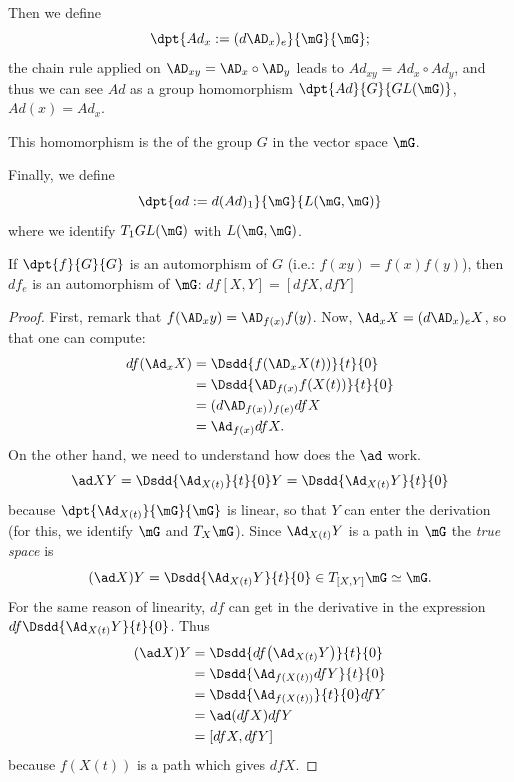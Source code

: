 Then we define
\[
	\dpt{Ad_x:=(d\AD_x)_e}{\mG}{\mG};
\]
the chain rule applied on $\AD_{xy}=\AD_x\circ\AD_y$ leads to $Ad_{xy}=Ad_x\circ Ad_y$, and thus we can see $Ad$ as a group homomorphism $\dpt{Ad}{G}{GL(\mG)}$, $Ad(x)=Ad_x$.

\begin{definition}
	This homomorphism is the  of the group $G$ in the vector space $\mG$.
\end{definition}


Finally, we define
\[
	\dpt{ad:=d(Ad)_1}{\mG}{L(\mG,\mG)}
\]
where we identify $T_1GL(\mG)$ with $L(\mG,\mG)$.

\begin{lemma}\label{LEMooEALFooJOeOgk}
	If $\dpt{f}{G}{G}$ is an automorphism of $G$ (i.e.: $f(xy)=f(x)f(y)$), then $df_e$ is an automorphism of $\mG$: $df[X,Y]=[df X,dfY]$
\end{lemma}

\begin{proof}
	First, remark that $f(\AD_xy)=\AD_{f(x)}f(y)$. Now, $\Ad_x X=(d\AD_x)_eX$, so that one can compute:
	\begin{equation}
		\begin{split}
			df(\Ad_xX) & =\Dsdd{f(\AD_xX(t))}{t}{0}           \\
			           & =\Dsdd{   \AD_{f(x)}f(X(t))  }{t}{0} \\
			           & =(d\AD_{f(x)})_{f(e)}df X            \\
			           & =\Ad_{f(x)}df X.
		\end{split}
	\end{equation}
	On the other hand, we need to understand how does the $\ad$ work.
	\[
		\ad XY=\Dsdd{\Ad_{X(t)}}{t}{0}Y=\Dsdd{\Ad_{X(t)}Y}{t}{0}
	\]
	because $\dpt{\Ad_{X(t)}}{\mG}{\mG}$ is linear, so that $Y$ can enter the derivation (for this, we identify $\mG$ and $T_X\mG$). Since $\Ad_{X(t)}Y$ is a path in $\mG$ the \emph{true space} is
	\[
		(\ad X)Y=\Dsdd{ \Ad_{X(t)}Y }{t}{0}\in T_{[X,Y]}\mG\simeq\mG.
	\]
	For the same reason of linearity, $df$ can get in the derivative in the expression $df\Dsdd{  \Ad_{X(t)}Y  }{t}{0}$. Thus
	\begin{equation}
		\begin{split}
			(\ad X)Y & =\Dsdd{  df\big(\Ad_{X(t)}Y\big)  }{t}{0} \\
			         & =\Dsdd{  \Ad_{ f(X(t)) }df Y  }{t}{0}     \\
			         & =\Dsdd{ \Ad_{f(X(t))} }{t}{0}df Y         \\
			         & =\ad(dfX)df Y                             \\
			         & =[dfX,df Y]
		\end{split}
	\end{equation}
	because $f(X(t))$ is a path which gives $df X$.
\end{proof}

